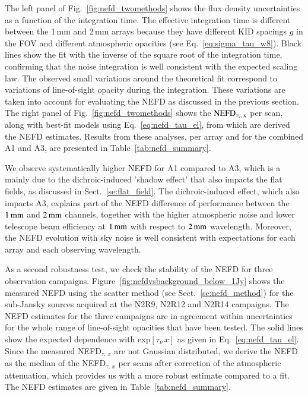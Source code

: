 \documentclass[traditionalabstract]{aa}
\newcommand{\taunu}{\tau_{\nu}}
\begin{document}
The left panel of Fig.~\ref{fig:nefd_twomethods} shows the flux density
uncertainties as a function of the integration time. The effective
integration time is different between the 1\,mm and 2\,mm arrays
because they have different KID spacings $g$ in the FOV and different
atmospheric opacities (see Eq.~\ref{eq:sigma_tau_w8}). Black lines show
the fit with the inverse of the square root of the integration time,
confirming that the noise integration is well consistent with the expected
scaling law. The observed small variations around the theoretical fit
correspond to variations of line-of-sight opacity during the
integration. These variations are taken into account for evaluating the NEFD as
discussed in the previous section. The right panel of
Fig.~\ref{fig:nefd_twomethods} shows the
$\rm{NEFD}_{\taunu,\, x}$ per scan, along with best-fit models using
Eq.~\ref{eq:nefd_tau_el}, from which are derived the \rm{NEFD} estimates. 
Results from these analyses, per array and for the
combined A1 and A3, are presented in Table~\ref{tab:nefd_summary}.

We observe systematically higher NEFD for A1 compared to A3, which is a mainly
due to the dichroic-induced 'shadow effect' that also impacts the flat fields,
as discussed in Sect.~\ref{se:flat_field}.  The dichroic-induced effect, which
also impacts A3, explains part of the NEFD difference of performance between the $1\, \rm{mm}$
and $2\, \rm{mm}$ channels, together with the higher atmospheric noise and lower
telescope beam efficiency at $1\, \rm{mm}$ with respect to $2\,\rm{mm}$
wavelength. Moreover, the NEFD evolution with sky noise is well
consistent with expectations for each array and each observing wavelength.

As a second robustness test, we check the stability of the NEFD for
three observation campaigns. Figure~\ref{fig:nefdvsbackground_below_1Jy} shows the
measured NEFD using the scatter method (see Sect.~\ref{se:nefd_method}) for the
sub-Jansky sources acquired at the N2R9, N2R12 and N2R14
campaigns. The NEFD estimates for the
three campaigns are in agreement within uncertainties for the whole
range of line-of-sight opacities that have been tested.
The solid lines show the expected dependence with
exp${[\taunu\,x]}$ as given in Eq.~\ref{eq:nefd_tau_el}. %
Since the measured NEFD$_{\tau,\, x}$ are not Gaussian distributed, we
derive the NEFD as the median of the NEFD$_{\tau,\, x}$
per scans after correction of the atmospheric attenuation, which provides us
with a more robust estimate compared to a fit. The NEFD estimates
are given in Table~\ref{tab:nefd_summary}.
\end{document}
